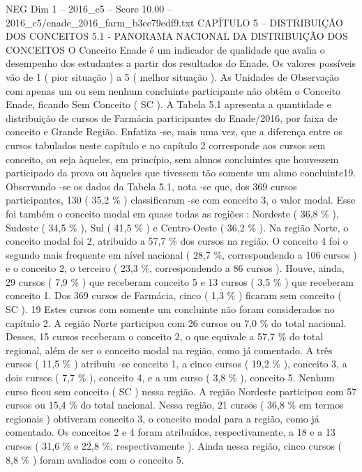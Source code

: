 \begin{textsample}{NEG Dim 1 – 2016\_c5 – Score 10.00 – 2016\_c5/enade\_2016\_farm\_b3ee79edf9.txt}  \label{ex:f1_neg_370}
CAPÍTULO 5 – DISTRIBUIÇÃO DOS CONCEITOS 5.1 - PANORAMA NACIONAL DA DISTRIBUIÇÃO DOS CONCEITOS O Conceito Enade é um indicador de qualidade que avalia o desempenho dos estudantes a partir dos resultados do Enade.
Os valores possíveis vão de 1 ( pior situação ) a 5 ( melhor situação ).
As Unidades de Observação com apenas um ou sem nenhum concluinte participante não obtêm o Conceito Enade, ficando Sem Conceito ( SC ).
A Tabela 5.1 apresenta a quantidade e distribuição de cursos de Farmácia participantes do Enade/2016, por faixa de conceito e Grande Região.
Enfatiza -se, mais uma vez, que a diferença entre os cursos tabulados neste capítulo e no capítulo 2 corresponde aos cursos sem conceito, ou seja àqueles, em princípio, sem alunos concluintes que houvessem participado da prova ou àqueles que tivessem tão somente um aluno concluinte19.
Observando -se os dados da Tabela 5.1, nota -se que, dos 369 cursos participantes, 130 ( 35,2 \% ) classificaram -se com conceito 3, o valor modal.
Esse foi também o conceito modal em quase todas as regiões : Nordeste ( 36,8 \% ), Sudeste ( 34,5 \% ), Sul ( 41,5 \% ) e Centro-Oeste ( 36,2 \% ).
Na região Norte, o conceito modal foi 2, atribuído a 57,7 \% dos cursos na região.
O conceito 4 foi o segundo mais frequente em nível nacional ( 28,7 \%, correspondendo a 106 cursos ) e o conceito 2, o terceiro ( 23,3 \%, correspondendo a 86 cursos ).
Houve, ainda, 29 cursos ( 7,9 \% ) que receberam conceito 5 e 13 cursos ( 3,5 \% ) que receberam conceito 1.
Dos 369 cursos de Farmácia, cinco ( 1,3 \% ) ficaram sem conceito ( SC ). 19 Estes cursos com somente um concluinte não foram considerados no capítulo 2.
A região Norte participou com 26 cursos ou 7,0 \% do total nacional.
Desses, 15 cursos receberam o conceito 2, o que equivale a 57,7 \% do total regional, além de ser o conceito modal na região, como já comentado.
A três cursos ( 11,5 \% ) atribuiu -se conceito 1, a cinco cursos ( 19,2 \% ), conceito 3, a dois cursos ( 7,7 \% ), conceito 4, e a um curso ( 3,8 \% ), conceito 5.
Nenhum curso ficou sem conceito ( SC ) nessa região.
A região Nordeste participou com 57 cursos ou 15,4 \% do total nacional.
Nessa região, 21 cursos ( 36,8 \% em termos regionais ) obtiveram conceito 3, o conceito modal para a região, como já comentado.
Os conceitos 2 e 4 foram atribuídos, respectivamente, a 18 e a 13 cursos ( 31,6 \% e 22,8 \%, respectivamente ).
Ainda nessa região, cinco cursos ( 8,8 \% ) foram avaliados com o conceito 5.

\end{textsample}
